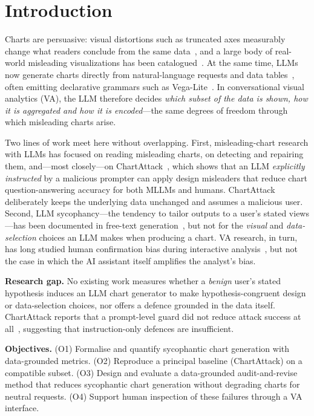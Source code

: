 \documentclass[conference]{IEEEtran}
\begin{document}
\section{Introduction}
Charts are persuasive: visual distortions such as truncated axes measurably change what readers conclude from the same data~\cite{pandey2015deceptive}, and a large body of real-world misleading visualizations has been catalogued~\cite{lo2022misinformed}. At the same time, LLMs now generate charts directly from natural-language requests and data tables~\cite{dibia2023lida}, often emitting declarative grammars such as Vega-Lite~\cite{satyanarayan2017vegalite}. In conversational visual analytics (VA), the LLM therefore decides \emph{which subset of the data is shown, how it is aggregated and how it is encoded}---the same degrees of freedom through which misleading charts arise.

Two lines of work meet here without overlapping. First, misleading-chart research with LLMs has focused on reading misleading charts, on detecting and repairing them, and---most closely---on ChartAttack~\cite{ortizbarajas2026chartattack}, which shows that an LLM \emph{explicitly instructed} by a malicious prompter can apply design misleaders that reduce chart question-answering accuracy for both MLLMs and humans. ChartAttack deliberately keeps the underlying data unchanged and assumes a malicious user. Second, LLM sycophancy---the tendency to tailor outputs to a user's stated views---has been documented in free-text generation~\cite{sharma2023sycophancy}, but not for the \emph{visual} and \emph{data-selection} choices an LLM makes when producing a chart. VA research, in turn, has long studied human confirmation bias during interactive analysis~\cite{wall2017warning,dimara2020taxonomy}, but not the case in which the AI assistant itself amplifies the analyst's bias.

\textbf{Research gap.} No existing work measures whether a \emph{benign} user's stated hypothesis induces an LLM chart generator to make hypothesis-congruent design or data-selection choices, nor offers a defence grounded in the data itself. ChartAttack reports that a prompt-level guard did not reduce attack success at all~\cite{ortizbarajas2026chartattack}, suggesting that instruction-only defences are insufficient.

\textbf{Objectives.} (O1) Formalise and quantify sycophantic chart generation with data-grounded metrics. (O2) Reproduce a principal baseline (ChartAttack) on a compatible subset. (O3) Design and evaluate a data-grounded audit-and-revise method that reduces sycophantic chart generation without degrading charts for neutral requests. (O4) Support human inspection of these failures through a VA interface.
\end{document}
